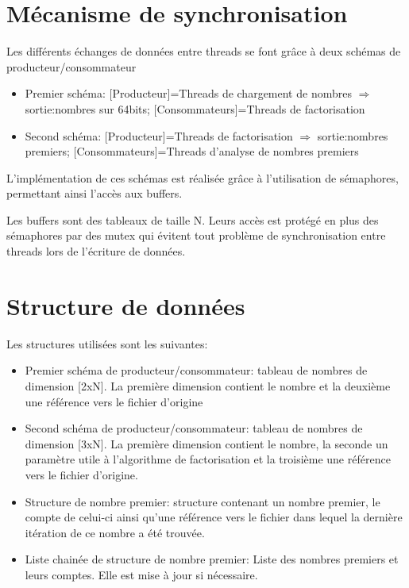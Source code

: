 \documentclass[11pt,a4paper]{article}
\begin{document}
\section*{Mécanisme de synchronisation}
Les différents échanges de données entre threads se font grâce à deux schémas de producteur/consommateur 

\begin{itemize}
\item{Premier schéma: [Producteur]=Threads de chargement de nombres $\Rightarrow$ sortie:nombres sur 64bits; [Consommateurs]=Threads de factorisation}
\item{Second schéma: [Producteur]=Threads de factorisation $\Rightarrow$ sortie:nombres premiers; [Consommateurs]=Threads d'analyse de nombres premiers}
\end{itemize}

L'implémentation de ces schémas est réalisée grâce à l'utilisation de sémaphores, permettant ainsi l'accès aux buffers.

Les buffers sont des tableaux de taille N. Leurs accès est protégé en plus des sémaphores par des mutex qui évitent tout problème de synchronisation entre threads lors de l'écriture de données.

\section*{Structure de données}
Les structures utilisées sont les suivantes:

\begin{itemize}
\item{Premier schéma de producteur/consommateur: tableau de nombres de dimension [2xN]. La première dimension contient le nombre et la deuxième une référence vers le fichier d'origine}
\item{Second schéma de producteur/consommateur: tableau de nombres de dimension [3xN]. La première dimension contient le nombre, la seconde un paramètre utile à l'algorithme de factorisation et la troisième une référence vers le fichier d'origine.}
\item{Structure de nombre premier: structure contenant un nombre premier, le compte de celui-ci ainsi qu'une référence vers le fichier dans lequel la dernière itération de ce nombre a été trouvée.}
\item{Liste chainée de structure de nombre premier: Liste des nombres premiers et leurs comptes. Elle est mise à jour si nécessaire.}
\end{itemize}
\end{document}
